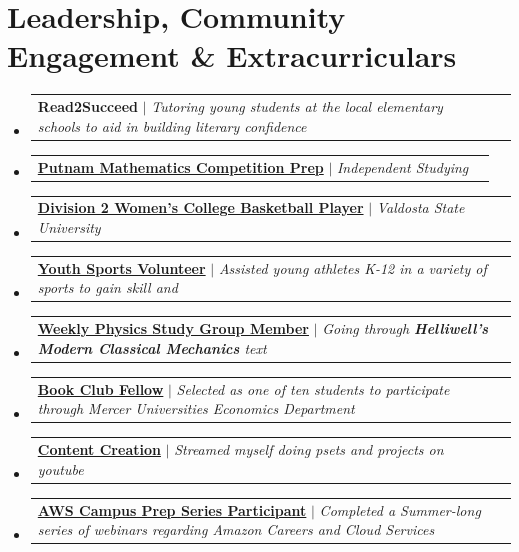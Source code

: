 \documentclass[letterpaper,11.000000001 pt]{article}
\makeatletter
\newcommand{\resumeProjectHeading}[2]{
    \item
    \begin{tabular*}{0.97\textwidth}{l@{\extracolsep{\fill}}r}
      \small#1 & #2 \\
    \end{tabular*}\vspace{-6pt}
}
\newcommand{\resumeSubHeadingListStart}{\begin{itemize}[leftmargin=0.15in, label={}]}
\newcommand{\resumeSubHeadingListEnd}{\end{itemize}}
\makeatother
\begin{document}
\section{Leadership, Community Engagement \& Extracurriculars}
  \resumeSubHeadingListStart
        \resumeProjectHeading
          {\textbf{Read2Succeed} $|$ \emph{Tutoring young students at the local elementary schools to aid in building literary confidence}}{}
        \resumeProjectHeading
          {\href{https://maa.org/putnam/}{\textbf{Putnam Mathematics Competition Prep}} $|$ \emph{Independent Studying}}{}
        \resumeProjectHeading
          {\href{https://vstateblazers.com/sports/womens-basketball}{\textbf{Division 2 Women's College Basketball Player}} $|$ \emph{Valdosta State University}}{}
        \resumeProjectHeading
          {\href{https://www.lifesportsacademy.net/home}{\textbf{Youth Sports Volunteer}} $|$ \emph{Assisted young athletes K-12 in a variety of sports to gain skill and }}{}
        \resumeProjectHeading
          {\href{https://www.meetup.com/physicswithfriends/}{\textbf{Weekly Physics Study Group Member}} $|$ \emph{Going through \textbf{Helliwell's Modern Classical Mechanics} text}}{}
        \resumeProjectHeading
          {\textbf{\href{https://csel.mercer.edu/student-engagement/book-clubs/}{Book Club Fellow}} $|$ \emph{Selected as one of ten students to participate through Mercer Universities Economics Department}}{}
        \resumeProjectHeading
          {\textbf{\href{https://www.youtube.com/@AP4Pres}{Content Creation}} $|$ \emph{Streamed myself doing psets and projects on youtube}}{}
        \resumeProjectHeading
          {\textbf{\href{https://www.gotostage.com/channel/ae3be1897f1e486ebe5a0a0d417396e2/recording/6ecf53ff64484050af20f49c86a9d760/watch}{AWS Campus Prep Series Participant}} $|$ \emph{Completed a Summer-long series of webinars regarding Amazon Careers and Cloud Services}}{}
  \resumeSubHeadingListEnd
\end{document}
